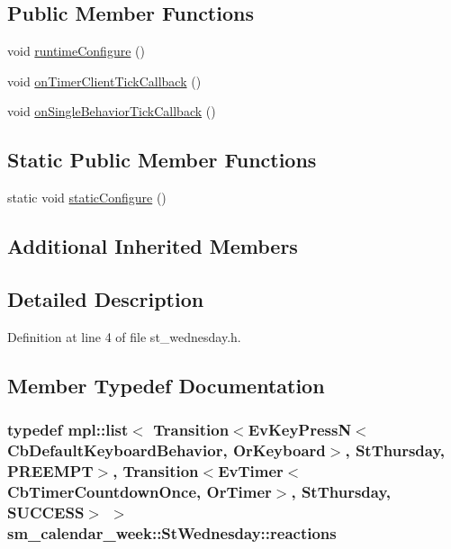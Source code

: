 \subsection*{Public Member Functions}
\begin{DoxyCompactItemize}
\item 
void \hyperlink{structsm__calendar__week_1_1StWednesday_a5f47539c7bdbfaa8c808b5045e95444c}{runtime\+Configure} ()
\item 
void \hyperlink{structsm__calendar__week_1_1StWednesday_a1ee9efe65b63cb472eaaf7c49f072ebc}{on\+Timer\+Client\+Tick\+Callback} ()
\item 
void \hyperlink{structsm__calendar__week_1_1StWednesday_ac7c04230cbb805c53a779f2fa2ca213b}{on\+Single\+Behavior\+Tick\+Callback} ()
\end{DoxyCompactItemize}
\subsection*{Static Public Member Functions}
\begin{DoxyCompactItemize}
\item 
static void \hyperlink{structsm__calendar__week_1_1StWednesday_a5e641d0acc42524bac18647f6ab02278}{static\+Configure} ()
\end{DoxyCompactItemize}
\subsection*{Additional Inherited Members}


\subsection{Detailed Description}


Definition at line 4 of file st\+\_\+wednesday.\+h.



\subsection{Member Typedef Documentation}
\subsubsection[{\texorpdfstring{reactions}{reactions}}]{\setlength{\rightskip}{0pt plus 5cm}typedef mpl\+::list$<$ Transition$<$Ev\+Key\+PressN$<$Cb\+Default\+Keyboard\+Behavior, {\bf Or\+Keyboard}$>$, {\bf St\+Thursday}, {\bf P\+R\+E\+E\+M\+PT}$>$, Transition$<$Ev\+Timer$<$Cb\+Timer\+Countdown\+Once, {\bf Or\+Timer}$>$, {\bf St\+Thursday}, {\bf S\+U\+C\+C\+E\+SS}$>$ $>$ {\bf sm\+\_\+calendar\+\_\+week\+::\+St\+Wednesday\+::reactions}}\hypertarget{structsm__calendar__week_1_1StWednesday_aa21e502e00fa09b841f8693bdb05e86d}{}\label{structsm__calendar__week_1_1StWednesday_aa21e502e00fa09b841f8693bdb05e86d}


